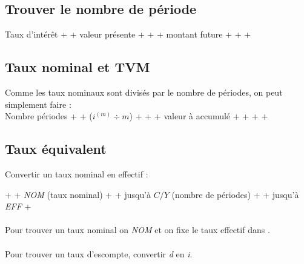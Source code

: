 \subsection{Trouver le nombre de période}
Taux d'intérêt +  + valeur présente + \fbox{+$ / $- } +  + montant future +  +  + 

\subsection{Taux nominal et TVM}
Comme les taux nominaux sont divisés par le nombre de périodes, on peut simplement faire : \\
Nombre périodes +  + ($i^{(m)} \div m$) + \fbox{=} +  + valeur à accumulé + \fbox{+$ / $-} +  +  + 
\\

\subsection{Taux équivalent}

Convertir un taux nominal en effectif : 

 +  + \emph{NOM} (taux nominal) +  + \fbox{$\Downarrow$} jusqu'à \emph{$C / Y$} (nombre de périodes) +  + \fbox{$\Uparrow$} jusqu'à \emph{EFF} + 
\\
\\ Pour trouver un taux nominal on  \emph{NOM} et on fixe le taux effectif dans .
\\
\\ Pour trouver un taux d'escompte, convertir \emph{d} en \emph{i}.

